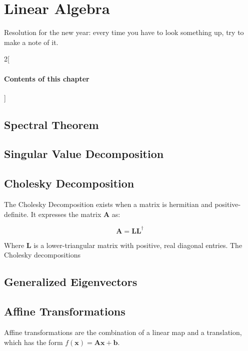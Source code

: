 \chapter{Linear Algebra}

Resolution for the new year: every time you have to look something up, try to make a note of it.

\begin{multicols}{2}[\subsubsection*{Contents of this chapter}]
\end{multicols}

\section{Spectral Theorem}

\section{Singular Value Decomposition}





\section{Cholesky Decomposition}
The Cholesky Decomposition exists when a matrix is hermitian and positive-definite. It expresses the matrix $\mathbf{A}$ as:

\begin{equation}
\mathbf{A} = \mathbf{L}\mathbf{L^\dagger}
\end{equation}

Where $\mathbf{L}$ is a lower-triangular matrix with positive, real diagonal entries. The Cholesky decompositions 

\section{Generalized Eigenvectors}

\section{Affine Transformations}

Affine transformations are the combination of a linear map and a translation, which has the form $f(\mathbf{x}) = \mathbf{A}\mathbf{x} + \mathbf{b}$. 

